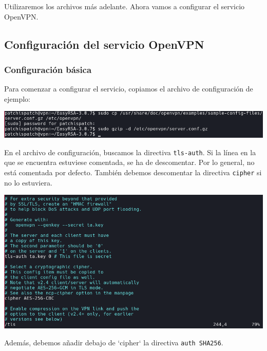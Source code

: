 \documentclass[11pt,a4paper]{article}
\begin{document}
\medskip

Utilizaremos los archivos más adelante. Ahora vamos a configurar el servicio OpenVPN.

\subsection{Configuración del servicio OpenVPN}

\subsubsection{Configuración básica}

Para comenzar a configurar el servicio, copiamos el archivo de configuración de ejemplo:

\medskip

\begin{center}
\includegraphics[scale=0.4]{gzip.png}
\end{center}

\medskip

En el archivo de configuración, buscamos la directiva \texttt{tls-auth}. Si la línea en la que se encuentra estuviese comentada, se ha de descomentar. Por lo general, no está comentada por defecto. También debemos descomentar la directiva \texttt{cipher} si no lo estuviera.

\medskip

\begin{center}
\includegraphics[scale=0.4]{tls-auth.png}
\end{center}

\medskip

Además, debemos añadir debajo de `cipher` la directiva \texttt{auth SHA256}.
\end{document}
